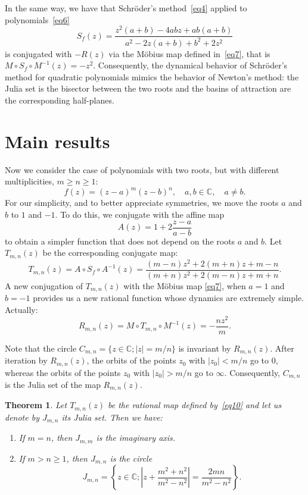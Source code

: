 \documentclass[10pt,a4paper]{article}
\newtheorem{Theorem}{Theorem}
\begin{document}
In the same way, we have that Schr\"oder's method~\eqref{eq4} applied to polynomials~\eqref{eq6} 
$$
S_f(z)=\frac{z^2 (a+b)-4 a b z+a b (a+b)}{a^2-2 z (a+b)+b^2+2 z^2}
$$is conjugated with $-R(z)$ via the M\"obius map defined in~\eqref{eq7},  that is $M\circ S_f\circ M^{-1}(z)=-z^2$. Consequently, the dynamical behavior of Schr\"oder's method for quadratic polynomials mimics the behavior of Newton's method: the Julia set is the bisector between the two roots and the basins of attraction are the corresponding half-planes.

\section{Main results}

Now we consider the case of polynomials with two roots, but with different multiplicities, $m\ge n\ge 1$:
\begin{equation}\label{eq8}
f(z)=(z-a)^m(z-b)^n,\quad a,b\in \mathbb{C}, \quad a\ne b.
\end{equation}
For our simplicity, and to better appreciate symmetries, we move the roots $a$ and $b$ to $1$ and $-1$. To do this, we conjugate with the affine map
\begin{equation}\label{eq9}
A(z)=1+2\frac{z-a}{a-b}
\end{equation}
to obtain a simpler function that does not depend on the roots $a$ and $b$. Let $T_{m,n}(z)$ be the corresponding conjugate map:
\begin{equation}\label{eq10}
T_{m,n}(z)=A\circ S_f\circ A^{-1}(z)=\frac{(m-n) z^2 +2 (m+n) z +m-n}{(m+n) z^2 +2(m-n)z +m+n}.
\end{equation}
A new conjugation of $T_{m,n}(z)$ with the M\"obius map \eqref{eq7}, when $a=1$ and $b=-1$ provides us a new rational function whose dynamics are extremely simple. Actually:
\begin{equation}\label{eq11}
R_{m,n}(z)=M\circ T_{m,n}\circ M^{-1}(z)=-\frac{nz^2}{m}.
\end{equation}

Note that the circle $C_{m,n}=\{z\in\mathbb{C}; |z|=m/n\}$ is invariant by $R_{m,n}(z)$. After iteration by $R_{m,n}(z)$, the orbits of the points $z_0$ with  $|z_0|<m/n$ go to 0, whereas the orbits  of the points $z_0$ with  $|z_0|>m/n$ go to $\infty$. Consequently, $C_{m,n}$ is the Julia set of the map $R_{m,n}(z)$.


\begin{Theorem}\label{teo1}
Let $T_{m,n}(z)$ be the rational map defined by~\eqref{eq10} and let us denote by  $J_{m,n}$ its Julia set. Then we have:
\begin{enumerate}
\item   If $m=n$,  then $J_{m,m}$ is the imaginary axis.
\item   If $m>n\ge 1$, then $J_{m,n}$  is the circle
$$J_{m,n}=\left\{z\in\mathbb{C}; \left|z+\frac{m^2+n^2}{m^2-n^2}\right|=\frac{2mn}{m^2-n^2}\right\}.$$
\end{enumerate}
\end{Theorem}
\end{document}
